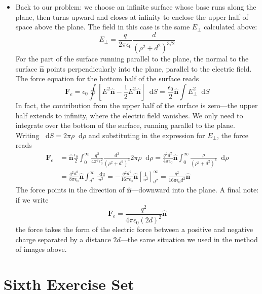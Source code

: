 \documentclass[11pt, a4paper]{article}
\newcommand{\diff}{\mathop{}\!\mathrm{d}} %
\renewcommand{\vec}[1]{\bm{#1}} %
\newcommand{\uvec}[1]{\hat{\vec{#1}}} %
\newcommand{\ee}{\epsilon_{0}}  %
\begin{document}
\begin{itemize}
	\item Back to our problem: we choose an infinite surface whose base runs along the plane, then turns upward and closes at infinity to enclose the upper half of space above the plane. The field in this case is the same $ E_{\perp} $ calculated above:
	\begin{equation*}
		E_{\perp} = \frac{q}{2\pi \ee}\frac{d}{(\rho^{2}+d^{2})^{3/2}}
	\end{equation*}
	For the part of the surface running parallel to the plane, the normal to the surface $ \uvec{n} $ points perpendicularly into the plane, parallel to the electric field. The force equation for the bottom half of the surface reads 
	\begin{equation*}
		\vec{F}_{e} = \ee \oint \left[E^{2}\uvec{n}- \frac{1}{2}E^{2}\uvec{n}\right]\diff S = \frac{\ee}{2}\uvec{n}\int E_{\perp}^{2}\diff S
	\end{equation*}
	In fact, the contribution from the upper half of the surface is zero---the upper half extends to infinity, where the electric field vanishes. We only need to integrate over the bottom of the surface, running parallel to the plane. Writing $ \diff S = 2\pi \rho \diff \rho $ and substituting in the expression for $ E_{\perp} $, the force reads
	\begin{align*}
		\vec{F}_{e} &= \uvec{n}\frac{\ee}{2}\int_{0}^{\infty} \frac{q^{2}}{4\pi^{2}\ee^{2}}\frac{d^{2}}{(\rho^{2} + d^{2})^{3}} 2\pi \rho \diff \rho = \frac{q^{2}d^{2}}{4\pi \ee}\uvec{n}\int_{0}^{\infty}\frac{\rho}{(\rho^{2} + d^{2})^{3}} \diff \rho\\
		&=  \frac{q^{2}d^{2}}{8\pi \ee}\uvec{n}\int_{d^{2}}^{\infty}\frac{\diff u}{u^{3}} = - \frac{q^{2}d^{2}}{16\pi \ee}\uvec{n} \left[\frac{1}{u^{2}}\right]_{d^{2}}^{\infty} = \frac{q^{2}}{16\pi \ee d^{2}}\uvec{n}
	\end{align*}
	The force points in the direction of $ \uvec{n} $---downward into the plane. A final note: if we write
	\begin{equation*}
		\vec{F}_{e} = \frac{q^{2}}{4\pi \ee (2d)^{2}}\uvec{n}
	\end{equation*}
	the force takes the form of the electric force between a positive and negative charge separated by a distance $ 2d $---the same situation we used in the method of images above. 
	
\end{itemize}

\section{Sixth Exercise Set}
\end{document}
